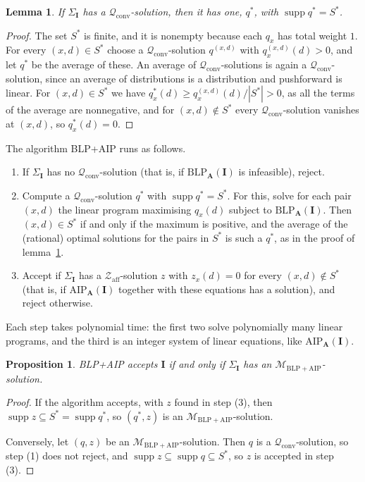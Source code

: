 \documentclass[11pt]{article}
\theoremstyle{plain}
\newtheorem{proposition}[theorem]{Proposition}
\newtheorem{lemma}[theorem]{Lemma}
\theoremstyle{definition}
\newcommand{\supp}{\operatorname{supp}}
\newcommand{\bA}{\mathbf{A}}
\newcommand{\bI}{\mathbf{I}}
\newcommand{\Qc}{\mathscr{Q}_{\mathrm{conv}}}
\newcommand{\Za}{\mathscr{Z}_{\mathrm{aff}}}
\newcommand{\Mba}{\mathscr{M}_{\mathrm{BLP+AIP}}}
\newcommand{\BLP}{\mathrm{BLP}}
\newcommand{\AIP}{\mathrm{AIP}}
\begin{document}
\begin{lemma}\label{lem:max-support}
If $\Sigma_{\bI}$ has a $\Qc$-solution, then it has one, $q^*$, with $\supp q^*=S^*$.
\end{lemma}

\begin{proof}
The set $S^*$ is finite, and it is nonempty because each $q_x$ has total weight $1$. For every $(x,d)\in S^*$ choose a $\Qc$-solution $q^{(x,d)}$ with $q^{(x,d)}_x(d)>0$, and let $q^*$ be the average of these. An average of $\Qc$-solutions is again a $\Qc$-solution, since an average of distributions is a distribution and pushforward is linear. For $(x,d)\in S^*$ we have $q^*_x(d)\geq q^{(x,d)}_x(d)/|S^*|>0$, as all the terms of the average are nonnegative, and for $(x,d)\notin S^*$ every $\Qc$-solution vanishes at $(x,d)$, so $q^*_x(d)=0$.
\end{proof}

The algorithm BLP+AIP runs as follows.
\begin{enumerate}[label=(\arabic*)]
  \item If $\Sigma_{\bI}$ has no $\Qc$-solution (that is, if $\BLP_{\bA}(\bI)$ is infeasible), reject.
  \item Compute a $\Qc$-solution $q^*$ with $\supp q^*=S^*$. For this, solve for each pair $(x,d)$ the linear program maximising $q_x(d)$ subject to $\BLP_{\bA}(\bI)$. Then $(x,d)\in S^*$ if and only if the maximum is positive, and the average of the (rational) optimal solutions for the pairs in $S^*$ is such a $q^*$, as in the proof of lemma~\ref{lem:max-support}.
  \item Accept if $\Sigma_{\bI}$ has a $\Za$-solution $z$ with $z_x(d)=0$ for every $(x,d)\notin S^*$ (that is, if $\AIP_{\bA}(\bI)$ together with these equations has a solution), and reject otherwise.
\end{enumerate}
Each step takes polynomial time: the first two solve polynomially many linear programs, and the third is an integer system of linear equations, like $\AIP_{\bA}(\bI)$.

\begin{proposition}\label{prop:ba}
BLP+AIP accepts $\bI$ if and only if $\Sigma_{\bI}$ has an $\Mba$-solution.
\end{proposition}

\begin{proof}
If the algorithm accepts, with $z$ found in step (3), then $\supp z\subseteq S^*=\supp q^*$, so $(q^*,z)$ is an $\Mba$-solution.

Conversely, let $(q,z)$ be an $\Mba$-solution. Then $q$ is a $\Qc$-solution, so step (1) does not reject, and $\supp z\subseteq\supp q\subseteq S^*$, so $z$ is accepted in step (3).
\end{proof}
\end{document}
